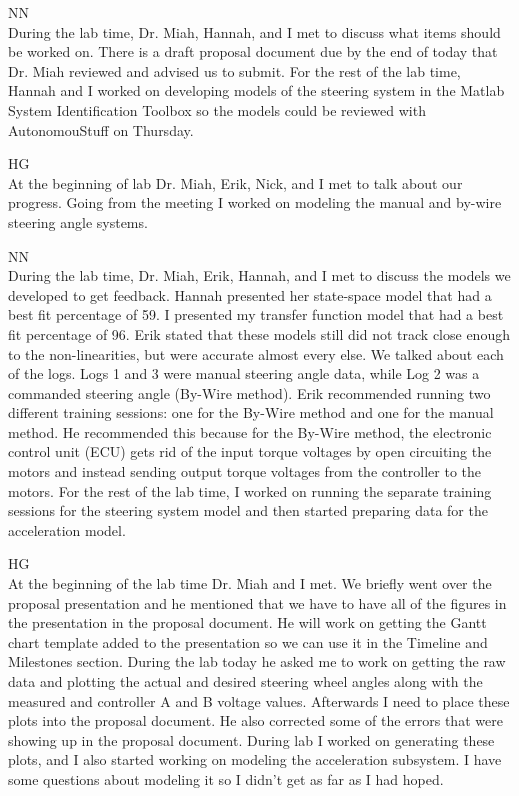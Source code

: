 \documentclass[fontsize=11pt, %
                             paper=letter, %
                             openany, %
                             captions=tableheading,
                             index=totoc,
                             hyperref]{labbook}
\def\currentYear{2021}
\begin{document}
\begin{addmargin}[0cm]{0cm}
NN\\
During the lab time, Dr. Miah, Hannah, and I met to discuss what items should be worked on. There is a draft proposal document due by the end of today that Dr. Miah reviewed and advised us to submit. For the rest of the lab time, Hannah and I worked on developing models of the steering system in the Matlab System Identification Toolbox so the models could be reviewed with AutonomouStuff on Thursday.


\labday{Thursday, November 4, \currentYear}
HG\\
At the beginning of lab Dr. Miah, Erik, Nick, and I met to talk about our progress. Going from the meeting I worked on modeling the manual and by-wire steering angle systems. 

NN\\
During the lab time, Dr. Miah, Erik, Hannah, and I met to discuss the models we developed to get feedback. Hannah presented her state-space model that had a best fit percentage of 59. I presented my transfer function model that had a best fit percentage of 96. Erik stated that these models still did not track close enough to the non-linearities, but were accurate almost every else. We talked about each of the logs. Logs 1 and 3 were manual steering angle data, while Log 2 was a commanded steering angle (By-Wire method). Erik recommended running two different training sessions: one for the By-Wire method and one for the manual method. He recommended this because for the By-Wire method, the electronic control unit (ECU) gets rid of the input torque voltages by open circuiting the motors and instead sending output torque voltages from the controller to the motors. For the rest of the lab time, I worked on running the separate training sessions for the steering system model and then started preparing data for the acceleration model.


\labday{Tuesday, November 9, \currentYear}
HG\\
At the beginning of the lab time Dr. Miah and I met. We briefly went over the proposal presentation and he mentioned that we have to have all of the figures in the presentation in the proposal document. He will work on getting the Gantt chart template added to the presentation so we can use it in the Timeline and Milestones section. During the lab today he asked me to work on getting the raw data and plotting the actual and desired steering wheel angles along with the measured and controller A and B voltage values. Afterwards I need to place these plots into the proposal document. He also corrected some of the errors that were showing up in the proposal document. During lab I worked on generating these plots, and I also started working on modeling the acceleration subsystem. I have some questions about modeling it so I didn't get as far as I had hoped. 


\end{addmargin}
\end{document}
